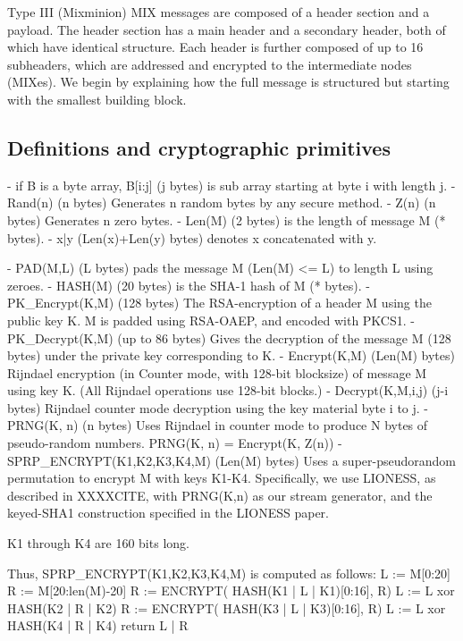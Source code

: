 Type III (Mixminion) MIX messages are composed of a header section and a
payload.  The header section has a main header and a
secondary header, both of which have identical structure.  Each
header is further composed of up to 16 subheaders, which are
addressed and encrypted to the intermediate nodes (MIXes).  We
begin by explaining how the full message is structured but starting
with the smallest building block.

\subsection{Definitions and cryptographic primitives}

- if B is a byte array, B[i:j] (j bytes) is sub array starting at 
  byte i with length j.
- Rand(n) (n bytes) Generates n random bytes by any secure method.
- Z(n) (n bytes) Generates n zero bytes.
- Len(M) (2 bytes) is the length of message M (* bytes).
- x|y (Len(x)+Len(y) bytes) denotes x concatenated with y.

- PAD(M,L) (L bytes) pads the message M (Len(M) <= L) to length L
  using zeroes.
- HASH(M) (20 bytes) is the SHA-1 hash of M (* bytes).
- PK_Encrypt(K,M) (128 bytes) The RSA-encryption of a header M 
  using the public key K.  M is padded using RSA-OAEP, and encoded
  with PKCS1.
- PK_Decrypt(K,M) (up to 86 bytes) Gives the decryption of the
  message M (128 bytes) under the private key corresponding to K.
- Encrypt(K,M) (Len(M) bytes) Rijndael encryption (in Counter mode,
  with 128-bit blocksize) of message M using key K.  (All Rijndael
  operations use 128-bit blocks.)
- Decrypt(K,M,i,j) (j-i bytes) Rijndael counter mode decryption 
  using the key material byte i to j.
- PRNG(K, n) (n bytes) Uses Rijndael in counter mode to produce N
  bytes of pseudo-random numbers.
  PRNG(K, n) = Encrypt(K, Z(n))
- SPRP_ENCRYPT(K1,K2,K3,K4,M) (Len(M) bytes) Uses a super-pseudorandom
  permutation to encrypt M with keys K1-K4.  Specifically, we use LIONESS,
  as described in XXXXCITE, with PRNG(K,n) as our stream generator,
  and the keyed-SHA1 construction specified in the LIONESS paper.

  K1 through K4 are 160 bits long.

  Thus, SPRP_ENCRYPT(K1,K2,K3,K4,M) is computed as follows:
            L := M[0:20]
            R := M[20:len(M)-20]
            R := ENCRYPT( HASH(K1 | L | K1)[0:16], R)
            L := L xor HASH(K2 | R | K2)
            R := ENCRYPT( HASH(K3 | L | K3)[0:16], R)
            L := L xor HASH(K4 | R | K4) 
            return L | R

